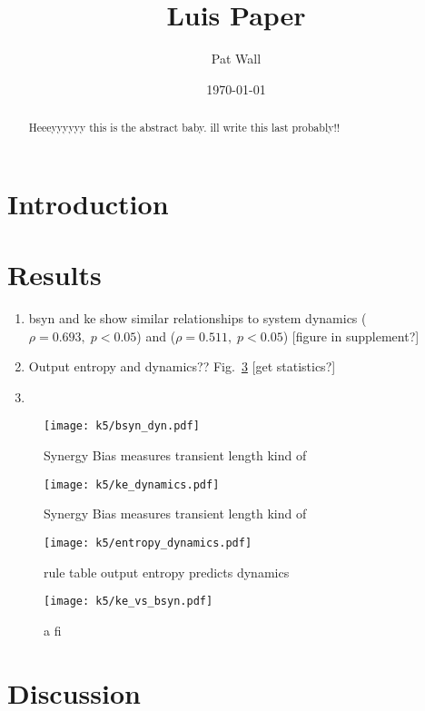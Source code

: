 \documentclass[12 pt]{article}
\title{Luis Paper}
\author{Pat Wall}
\date{\today}
\newcommand{\figref}[1]{Fig.~\ref{fig:#1}}
\begin{document}
\maketitle

\begin{abstract}
    Heeeyyyyyy this is the abstract baby. ill write this last probably!!
\end{abstract}

\section{Introduction}

\section{Results}

\begin{enumerate}
    \item bsyn and ke show similar relationships to system dynamics ($\rho=0.693, \; p<0.05$) and ($\rho=0.511, \; p<0.05$) [figure in supplement?] 
    \item Output entropy and dynamics?? \figref{ent-dyn} [get statistics?]
    \item 
\end{enumerate}

\begin{figure} 
    \texttt{[image: k5/bsyn\_dyn.pdf]}
    \caption{Synergy Bias measures transient length kind of}
    \label{fig:bsyn-dyn}
\end{figure}

\begin{figure} 
    \texttt{[image: k5/ke\_dynamics.pdf]}
    \caption{Synergy Bias measures transient length kind of}
    \label{fig:ke-dyn}
\end{figure}

\begin{figure}
    \texttt{[image: k5/entropy\_dynamics.pdf]}
    \caption{rule table output entropy predicts dynamics}
    \label{fig:ent-dyn}
\end{figure}

\begin{figure}
    \texttt{[image: k5/ke\_vs\_bsyn.pdf]}
    \caption{a fi}
    \label{fig:be-bsyn}
\end{figure}

\section{Discussion}
\end{document}
